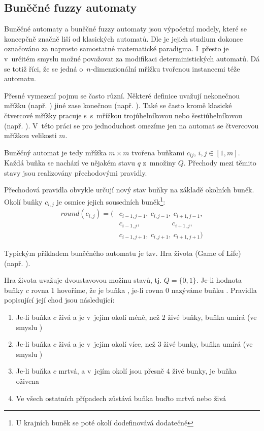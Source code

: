 \subsection{Buněčné fuzzy automaty}
Buněčné automaty a buněčné fuzzy automaty jsou výpočetní modely, které se koncepčně značně liší od klasických automatů. Dle \cite{Wol-NewKinSci} je jejich studium dokonce označováno za naprosto samostatné matematické paradigma. I~přesto je v~určitém smyslu možné považovat za modifikaci  deterministických automatů. Dá se totiž říci, že se jedná o~$n$-dimenzionální mřížku tvořenou instancemi téže automatu.

Přesné vymezení pojmu  se často různí. Některé definice uvažují nekonečnou mřížku (např. \cite{Wol-NewKinSci, Wol-CelAut, BatXie-CellCity}) jiné zase konečnou (např. \cite{Wu-ExpGenPolUrbGroCelAutCit}). Také se často kromě klasické čtvercové mřížky pracuje s~s~mřížkou trojúhelníkovou nebo šestiúhelníkovou (např. \cite{For-FuzCelAutConjNormForm}). V~této práci se pro jednoduchost omezíme jen na automat se čtvercovou mřížkou velikosti $m$.

Buněčný automat je tedy mřížka $m \times m$ tvořena buňkami $c_{ij}$, $i, j \in [1,m]$. Každá buňka se nachází ve nějakém stavu $q$ z~množiny $Q$. Přechody mezi těmito stavy jsou realizovány přechodovými pravidly. 

Přechodová pravidla obvykle určují nový stav buňky na základě okolních buněk. Okolí buňky $c_{i,j}$ je osmice jejich sousedních buněk\footnote{U krajních buněk se poté okolí dodefinovává dodatečně}:
\begin{align*}
 round(c_{i,j}) = (
  & c_{i-1, j-1},\ 	c_{i, j-1},\ 	c_{i+1, j-1},	\\
  & c_{i-1, j  },\ 	\qquad \qquad\ 	c_{i+1, j  },	\\
  & c_{i-1, j+1},\ 	c_{i, j+1},\ 	c_{i+1, j+1}	
 )
\end{align*}

\begin{example} \label{ex:GameOfLife}
  Typickým příkladem buněčného automatu je tzv. Hra života (Game of Life) (např. \cite{TofMar-CelAuMach+}).
  
  Hra života uvažuje dvoustavovou možinu stavů, tj. $Q = \{ 0, 1 \}$. Je-li hodnota buňky $c$ rovna $1$ hovoříme, že je buňka , je-li rovna $0$ nazýváme buňku . Pravidla popisující její chod jsou následující:
  \begin{enumerate}
   \item Je-li buňka $c$ živá a je v~jejím okolí méně, než $2$ živé buňky, buňka umírá (ve smyslu )
   \item Je-li buňka $c$ živá a je v~jejím okolí více, než $3$ živé bunky, buňka umírá (ve smyslu )
   \item Je-li buňka $c$ mrtvá, a v~jejím okolí jsou přesně $4$ živé bunky, je buňka oživena
   \item Ve všech ostatních případech zůstává buňka buďto mrtvá nebo živá 
  \end{enumerate}
\end{example}

